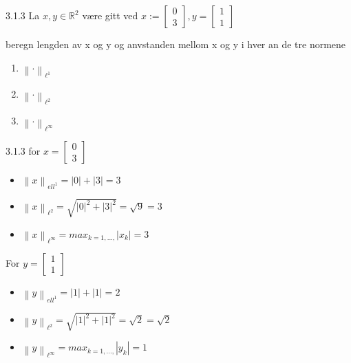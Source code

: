 \documentclass[a4paper,norsk]{article}
\begin{document}
\begin{oppgavebox}{3.1.3}{}
La $ x, y \in \mathbb{R}^2 $ være gitt ved $ x := \begin{bmatrix}
    0\\ 3
\end{bmatrix}, y = \begin{bmatrix}
    1\\1
\end{bmatrix}   $ 

beregn lengden av x og y og anvstanden mellom x og y i hver an de tre normene
\begin{enumerate}
    \item $ \left\lVert \cdot \right\rVert _{\ell^1} $ 
    \item $ \left\lVert \cdot \right\rVert _{\ell^2} $ 
    \item $ \left\lVert \cdot \right\rVert _{\ell^{\infty}} $ 
\end{enumerate}

\begin{proofbox}{3.1.3}{}
for $ x = \begin{bmatrix}
    0\\3
\end{bmatrix}  $ 
\begin{itemize}
    \item $ \left\lVert x \right\rVert _{ell^1}  = \left| 0 \right| + \left| 3 \right| =3$
    \item $ \left\lVert x \right\rVert _{\ell^2} = \sqrt{ \left| 0 \right| ^2 + \left| 3 \right| ^2 } = \sqrt{ 9 } = 3 $
    \item $ \left\lVert x \right\rVert _{\ell^{\infty}} = max_{k=1, ... ,} \left| x_k \right|  = 3 $  
\end{itemize}

For $ y = \begin{bmatrix}
    1\\1
\end{bmatrix}  $ 
\begin{itemize}
    \item $ \left\lVert y \right\rVert _{ell^1}  = \left| 1 \right| + \left| 1 \right| =2$
    \item $ \left\lVert y \right\rVert _{\ell^2} = \sqrt{ \left| 1 \right| ^2 + \left| 1 \right| ^2 } = \sqrt{ 2 } = \sqrt{ 2 } $
    \item $ \left\lVert y \right\rVert _{\ell^{\infty}} = max_{k=1, ... ,} \left| y_k \right|  = 1 $  
\end{itemize}


\end{proofbox}
\end{oppgavebox}
\end{document}
